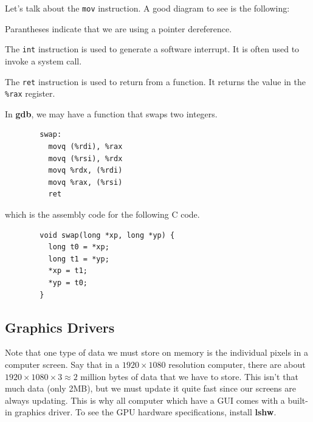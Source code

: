 \documentclass{article}
\begin{document}
    \begin{definition}[mov]
      Let's talk about the \texttt{mov} instruction. A good diagram to see is the following: 
      \begin{center}  
      \end{center} 
      Parantheses indicate that we are using a pointer dereference. 
    \end{definition}

    \begin{definition}[int]
      The \texttt{int} instruction is used to generate a software interrupt. It is often used to invoke a system call.
    \end{definition}

    \begin{definition}[ret]
      The \texttt{ret} instruction is used to return from a function. It returns the value in the \texttt{\%rax} register. 
    \end{definition}

    \begin{example}
      In \textbf{gdb}, we may have a function that swaps two integers. 
      \begin{lstlisting} 
        swap:
          movq (%rdi), %rax
          movq (%rsi), %rdx
          movq %rdx, (%rdi)
          movq %rax, (%rsi)
          ret
      \end{lstlisting}
    which is the assembly code for the following C code.
      \begin{lstlisting} 
        void swap(long *xp, long *yp) {
          long t0 = *xp;
          long t1 = *yp;
          *xp = t1;
          *yp = t0;
        }
      \end{lstlisting}
    \end{example}

  \subsection{Graphics Drivers}
    
    Note that one type of data we must store on memory is the individual pixels in a computer screen. Say that in a $1920 \times 1080$ resolution computer, there are about $1920 \times 1080 \times 3 \approx 2$ million bytes of data that we have to store. This isn't that much data (only 2MB), but we must update it quite fast since our screens are always updating. This is why all computer which have a GUI comes with a built-in graphics driver. To see the GPU hardware specifications, install \textbf{lshw}. 
\end{document}
